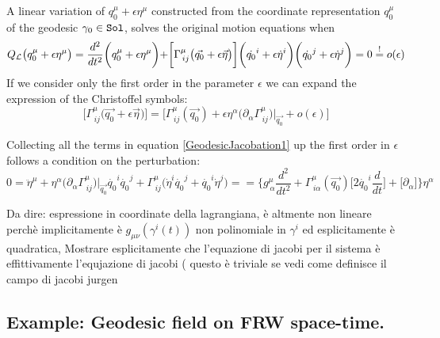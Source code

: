 \documentclass[Main]{subfiles}
\begin{document}
	A linear variation of $q_0^\mu +\epsilon \eta^\mu$ constructed from the coordinate representation $q_0^\mu$ of the geodesic $\gamma_0 \in \mathtt{Sol}$, solves the original motion equations when
	\begin{equation}\label{GeodesicJacobation1}
		Q_{\mathcal{L}} \big( q_0^\mu +\epsilon \eta^\mu \big) = \frac{d^2}{dt^2}\biggr( q_0^\mu +\epsilon \eta^\mu \biggr) +
		\biggr[ \Gamma^\mu_{\, i j}\big( \vec{q_0} + \epsilon \vec{\eta}\big) \biggr]\biggr(\dot{q_0}^i +\epsilon \dot{\eta}^i \biggr)\biggr(\dot{q_0}^j +\epsilon \dot{\eta}^j \biggr) = 0 \overset{!}{=} o(\epsilon)
	\end{equation}
	If we consider only the first order in the parameter $\epsilon$ we can expand the expression of the Christoffel symbols:
	\begin{displaymath}
		\biggr[ \Gamma^\mu_{\, i j}\big( \vec{q_0} + \epsilon \vec{\eta}\big) \biggr] =
		\biggr[ \Gamma^\mu_{\, i j}( \vec{q_0}) + \epsilon \eta^\alpha\big( \partial_\alpha  \Gamma^\mu_{\, i j} \big)\biggr\vert_{\vec{q_0}} + o(\epsilon) \biggr]
	\end{displaymath}	 
	
	Collecting all the terms in equation \ref{GeodesicJacobation1} up the first order in $\epsilon$ follows a condition on the perturbation:
	\begin{displaymath}
	0 = \ddot{\eta}^\mu + \eta^\alpha\big( \partial_\alpha  \Gamma^\mu_{\, i j} \big)\biggr\vert_{\vec{q_0}} \dot{q_0}^i \dot{q_0}^j  +  \Gamma^\mu_{\, i j} \big(\dot{\eta}^i \dot{q_0}^j + \dot{q_0}^i \dot{\eta}^j \big)=
	=\biggr\{ g^\mu_{\,\alpha} \frac{d^2}{dt^2} +
	 \Gamma^\mu_{\, i \alpha}(\vec{q_0})\big[2 \dot{q_0}^i \frac{d}{dt} \big] + 
\big[ \partial_\alpha  \big] \biggr\} \eta^\alpha	 
	\end{displaymath}		
	
	
	\begin{Warning}
	Da dire: espressione in coordinate della lagrangiana, è altmente non lineare perchè implicitamente è $g_{\mu\nu}(\gamma^i(t))$ non polinomiale in $\gamma^i$ ed esplicitamente è quadratica, Mostrare esplicitamente che l'equazione di jacobi per il sistema è effittivamente l'equjazione di jacobi ( questo è triviale se vedi come definisce il campo di jacobi jurgen 
	\end{Warning}	


	
	

\subsection{Example: Geodesic field on FRW space-time.}
\end{document}
